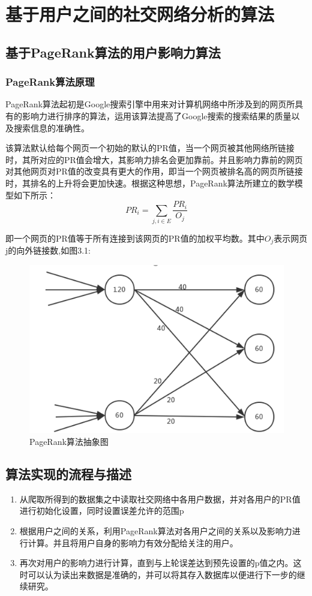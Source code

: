 \chapter{基于用户之间的社交网络分析的算法}
\section{基于PageRank算法的用户影响力算法}
\subsection{PageRank算法原理}
PageRank算法起初是Google搜索引擎中用来对计算机网络中所涉及到的网页所具有的影响力进行排序的算法，运用该算法提高了Google搜索的搜索结果的质量以及搜索信息的准确性。
\par
该算法默认给每个网页一个初始的默认的PR值，当一个网页被其他网络所链接时，其所对应的PR值会增大，其影响力排名会更加靠前。并且影响力靠前的网页对其他网页对PR值的改变具有更大的作用，即当一个网页被排名高的网页所链接时，其排名的上升将会更加快速。根据这种思想，PageRank算法所建立的数学模型如下所示：
\begin{equation}
PR_i=\sum_{{j,i}\in E} \frac{PR_i}{O_j}
\end{equation}

即一个网页的PR值等于所有连接到该网页的PR值的加权平均数。其中$O_j$表示网页j的向外链接数,如图3.1:

\begin{figure}[h]
	\centering
	\includegraphics[scale=0.5]{figures/1.png}
	\caption{PageRank算法抽象图}
	\label{fig:1}
\end{figure}

\section{算法实现的流程与描述}
\begin{enumerate}[(1)]
	\item 从爬取所得到的数据集之中读取社交网络中各用户数据，并对各用户的PR值进行初始化设置，同时设置误差允许的范围p
	\item 根据用户之间的关系，利用PageRank算法对各用户之间的关系以及影响力进行计算。并且将用户自身的影响力有效分配给关注的用户。
	\item 再次对用户的影响力进行计算，直到与上轮误差达到预先设置的p值之内。这时可以认为读出来数据是准确的，并可以将其存入数据库以便进行下一步的继续研究。
\end{enumerate}

